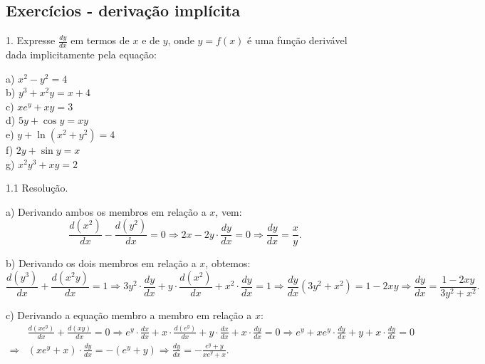 \documentclass{article}
\begin{document}
{\begin{newpage}
\subsection{Exercícios - derivação implícita}
\vspace{0.3cm}
\begin{flushleft}
1. Expresse $\displaystyle{\frac{dy}{dx}}$ em termos de $x$ e de $y$, onde $y=f(x)$ é uma função derivável dada implicitamente pela equação:
\end{flushleft}
\par
\begin{multicols}{2}
\hspace{-15pt}a) $x^2 - y^2 = 4$ \\
b) $y^3 + x^{2}y = x+4$ \\
c) $xe^{y} + xy = 3$ \\
d) $5y + \cos{y} = xy $\\
e) $y + \ln{(x^2 + y^2)} = 4$ \\
f) $2y + \sin{y}=x$ \\
g) $x^{2}y^{3} + xy = 2$ \\
\end{multicols}
\par
\vspace{0.3cm}
\begin{flushleft}
1.1 Resolução.
\end{flushleft}
\par
a) Derivando ambos os membros em relação a $x$, vem:
\begin{equation*} \displaystyle{\frac{d(x^2)}{dx} - \frac{d(y^2)}{dx} = 0 \Rightarrow 2x - 2y\cdot\frac{dy}{dx} = 0 \Rightarrow \frac{dy}{dx} = \frac{x}{y}} .\end{equation*}
\par
\vspace{0.3cm}
b) Derivando os dois membros em relação a $x$, obtemos:
\begin{equation*} \displaystyle{\frac{d(y^3)}{dx} + \frac{d(x^{2}y)}{dx} = 1 \Rightarrow 3y^{2}\cdot\frac{dy}{dx} + y\cdot\frac{d(x^2)}{dx} + x^{2}\cdot\frac{dy}{dx} = 1 \Rightarrow \frac{dy}{dx}(3y^2 + x^2) = 1 - 2xy \Rightarrow \frac{dy}{dx} = \frac{1 - 2xy}{3y^2 + x^2}} .\end{equation*}
\par
\vspace{0.3cm}
c) Derivando a equação membro a membro em relação a $x$:
\begin{equation*} \displaystyle{\begin{split} &\frac{d(xe^{y})}{dx} + \frac{d(xy)}{dx} = 0 \Rightarrow e^{y}\cdot\frac{dx}{dx} + x\cdot\frac{d(e^{y})}{dx} + y\cdot\frac{dx}{dx} + x\cdot\frac{dy}{dx} = 0 \Rightarrow e^{y} + xe^{y}\cdot\frac{dy}{dx} + y + x\cdot\frac{dy}{dx} = 0 \\ \Rightarrow &(xe^{y} + x)\cdot\frac{dy}{dx} = -(e^{y} + y) \Rightarrow \frac{dy}{dx} = -\frac{e^{y} + y}{xe^{y} + x} .\end{split}} \end{equation*}

\end{newpage}}
\end{document}

